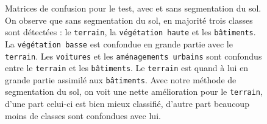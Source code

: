 \documentclass[a4paper, onecolumn, 11pt]{article}
\begin{document}
\begin{figure}
    \centering
    \qquad
    \caption{Matrices de confusion pour le test, avec et sans segmentation du sol. On observe que sans segmentation du sol, en majorité trois classes sont détectées : le \texttt{terrain}, la \texttt{végétation haute} et les \texttt{bâtiments}. La \texttt{végétation basse} est confondue en grande partie avec le \texttt{terrain}. Les \texttt{voitures} et les \texttt{aménagements urbains} sont confondus entre le \texttt{terrain} et les \texttt{bâtiments}. Le \texttt{terrain} est quand à lui en grande partie assimilé aux \texttt{bâtiments}. Avec notre méthode de segmentation du sol, on voit une nette amélioration pour le \texttt{terrain}, d'une part celui-ci est bien mieux classifié, d'autre part beaucoup moins de classes sont confondues avec lui.}
    \label{fig:ground}
\end{figure}



\raggedbottom
\end{document}

